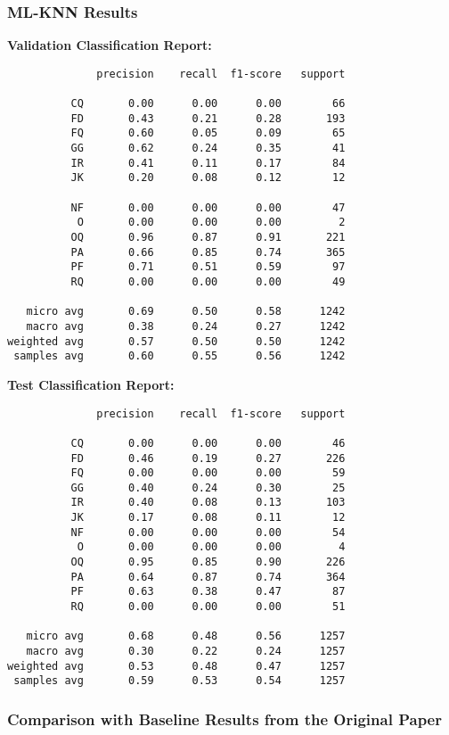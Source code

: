 \documentclass{article}
\begin{document}
\subsubsection{ML-KNN Results}
\textbf{Validation Classification Report:}
\begin{verbatim}
              precision    recall  f1-score   support

          CQ       0.00      0.00      0.00        66
          FD       0.43      0.21      0.28       193
          FQ       0.60      0.05      0.09        65
          GG       0.62      0.24      0.35        41
          IR       0.41      0.11      0.17        84
          JK       0.20      0.08      0.12        12

          NF       0.00      0.00      0.00        47
           O       0.00      0.00      0.00         2
          OQ       0.96      0.87      0.91       221
          PA       0.66      0.85      0.74       365
          PF       0.71      0.51      0.59        97
          RQ       0.00      0.00      0.00        49

   micro avg       0.69      0.50      0.58      1242
   macro avg       0.38      0.24      0.27      1242
weighted avg       0.57      0.50      0.50      1242
 samples avg       0.60      0.55      0.56      1242
\end{verbatim}
\textbf{Test Classification Report:}
\begin{verbatim}
              precision    recall  f1-score   support

          CQ       0.00      0.00      0.00        46
          FD       0.46      0.19      0.27       226
          FQ       0.00      0.00      0.00        59
          GG       0.40      0.24      0.30        25
          IR       0.40      0.08      0.13       103
          JK       0.17      0.08      0.11        12
          NF       0.00      0.00      0.00        54
           O       0.00      0.00      0.00         4
          OQ       0.95      0.85      0.90       226
          PA       0.64      0.87      0.74       364
          PF       0.63      0.38      0.47        87
          RQ       0.00      0.00      0.00        51

   micro avg       0.68      0.48      0.56      1257
   macro avg       0.30      0.22      0.24      1257
weighted avg       0.53      0.48      0.47      1257
 samples avg       0.59      0.53      0.54      1257
\end{verbatim}

\subsubsection{Comparison with Baseline Results from the Original Paper}
\end{document}
